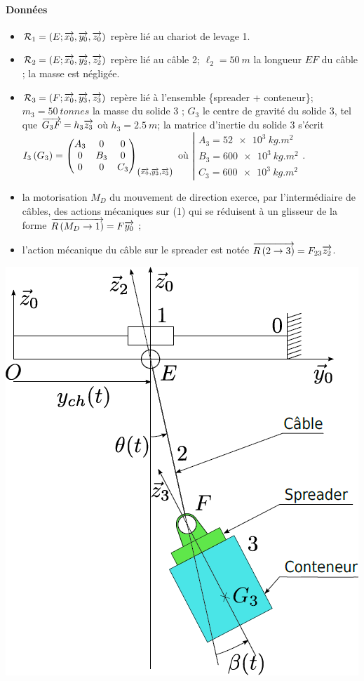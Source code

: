 \documentclass[10pt,fleqn]{article} %
\begin{document}
\begin{multicols}{2}
\paragraph*{Données}
\begin{itemize}
\item $\mathcal{R}_1=\repere{E}{x_0}{y_0}{z_0}$  repère lié au chariot de levage 1.
\item $\mathcal{R}_2=\repere{E}{x_0}{y_2}{z_2}$  repère lié au câble 2; $\ell_2 = \SI{50}{m}$ la longueur $EF$
du câble ; la masse est négligée.
\item $\mathcal{R}_3=\repere{F}{x_0}{y_3}{z_3}$  repère lié à l’ensemble \{spreader + conteneur\};
$m_3 = \SI{50}{tonnes}$ la masse du solide 3 ; $G_3$ le centre de gravité du
solide 3, tel que $\vect{G_3F}=h_3\vect{z_3}$ où $h_3 = \SI{2,5}{m}$; la matrice d’inertie du solide 3 s’écrit
$\inertie{3}{G_3}=\matinertie{A_3}{B_3}{C_3}{0}{0}{0}{\left(\vect{x_0},\vect{y_3},\vect{z_3} \right)}$ où $\left| \begin{array}{l} A_3 = \SI{52e3}{kg.m^2} \\ B_3 = \SI{600e3}{kg.m^2} \\ C_3 = \SI{600e3}{kg.m^2} \end{array}\right.$. 
\item la motorisation $M_D$ du mouvement de direction exerce, par l’intermédiaire de câbles, des actions mécaniques sur (1) qui se réduisent
à un glisseur de la forme $\vectf{M_D}{1} =F \vect{y_0}$ ;
\item l’action mécanique du câble sur le spreader est notée $\vectf{2}{3} =F_{23} \vect{z_2}$.
\end{itemize}



\begin{center}
\includegraphics[width=.8\linewidth]{images/fig_01}
\end{center}



\end{multicols}
\end{document}
